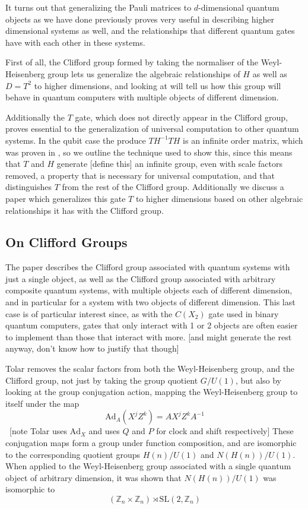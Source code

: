 It turns out that generalizing the Pauli matrices to $d$-dimensional quantum objects as we have done previously proves very useful in describing higher dimensional systems as well, and the relationships that different quantum gates have with each other in these systems.

First of all, the Clifford group formed by taking the normaliser of the Weyl-Heisenberg group lets us generalize the algebraic relationships of $H$ as well as $D = T^2$ to higher dimensions, and looking at \cite{tolar-clifford} will tell us how this group will behave in quantum computers with multiple objects of different dimension.

Additionally the $T$ gate, which does not directly appear in the Clifford group, proves essential to the generalization of universal computation to other quantum systems. In the qubit case the produce $TH^{-1}TH$ is an infinite order matrix, which was proven in \cite{pi-over-eight}, so we outline the technique used to show this, since this means that $T$ and $H$ generate [define this] an infinite group, even with scale factors removed, a property that is necessary for universal computation, and that distinguishes $T$ from the rest of the Clifford group. Additionally we discuss a paper \cite{pi-over-eight} which generalizes this gate $T$ to higher dimensions based on other algebraic relationships it has with the Clifford group.
\subsection{On Clifford Groups}
The paper \cite{tolar-clifford} describes the Clifford group associated with quantum systems with just a single object, as well as the Clifford group associated with arbitrary composite quantum systems, with multiple objects each of different dimension, and in particular for a system with two objects of different dimension. This last case is of particular interest since, as with the $C(X_2)$ gate used in binary quantum computers, gates that only interact with 1 or 2 objects are often easier to implement than those that interact with more. [and might generate the rest anyway, don't know how to justify that though]

Tolar removes the scalar factors from both the Weyl-Heisenberg group, and the Clifford group, not just by taking the group quotient $G/U(1)$, but also by looking at the group conjugation action, mapping the Weyl-Heisenberg group to itself under the map
\[\text{Ad}_A(X^jZ^k) = AX^jZ^kA^{-1}\]
\ [note Tolar uses $\text{Ad}_X$ and uses $Q$ and $P$ for clock and shift respectively] These conjugation maps form a group under function composition, and are isomorphic to the corresponding quotient groups $H(n)/U(1)$ and $N(H(n))/U(1)$. When applied to the Weyl-Heisenberg group associated with a single quantum object of arbitrary dimension, it was shown that $N(H(n))/U(1)$ was isomorphic to
\[(\mathbb{Z}_n\times\mathbb{Z}_n)\rtimes\text{SL}(2,\mathbb{Z}_n)\]

